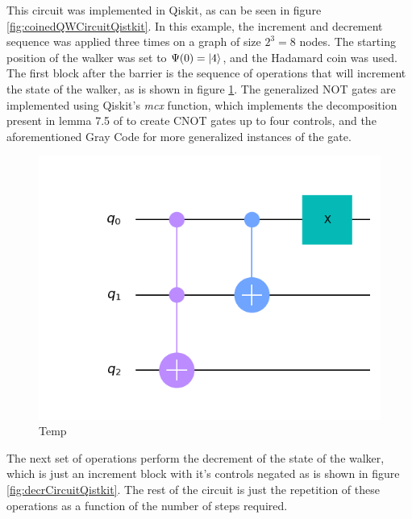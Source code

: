 \documentclass[../../dissertation.tex]{subfiles}
\begin{document}
This circuit was implemented in Qiskit, as can be seen in figure \ref{fig:coinedQWCircuitQistkit}. In this example, the increment and decrement sequence was applied three times on a graph of size $2^3 =8$ nodes. The starting position of the walker was set to $\Psi(0) = \ket{4}$, and the Hadamard coin was used. The first block after the barrier is the sequence of operations that will increment the state of the walker, as is shown in figure \ref{fig:incrCircuitQistkit}. The generalized NOT gates are implemented using Qiskit's \textit{mcx} function, which implements the decomposition present in lemma 7.5 of \cite{barenco95} to create CNOT gates up to four controls, and the aforementioned Gray Code for more generalized instances of the gate.
\begin{figure}[!h]
	\centering
	\includegraphics[scale=0.32]{img/Qiskit/CoinedQuantumWalk/Circuits/circIncr_N3_S3.png}
	\caption{Temp} 
	\label{fig:incrCircuitQistkit}
\end{figure}
The next set of operations perform the decrement of the state of the walker, which is just an increment block with it's controls negated as is shown in figure \ref{fig:decrCircuitQistkit}. The rest of the circuit is just the repetition of these operations as a function of the number of steps required.
\end{document}
